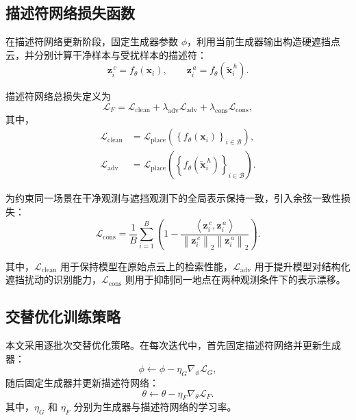 \documentclass[UTF8,a4paper,12pt]{ctexart}
\newcommand{\norm}[1]{\left\lVert #1 \right\rVert_2}
\newcommand{\inner}[2]{\left\langle #1, #2 \right\rangle}
\newcommand{\setc}[1]{\left\{#1\right\}}
\begin{document}
\subsection{描述符网络损失函数}
在描述符网络更新阶段，固定生成器参数 $\phi$，利用当前生成器输出构造硬遮挡点云，并分别计算干净样本与受扰样本的描述符：
\begin{equation}
\bm{z}^{\,c}_i=f_{\theta}(\bm{x}_i),\qquad
\bm{z}^{\,a}_i=f_{\theta}\!\left(\tilde{\bm{x}}^{\,h}_i\right).
\label{eq:clean_adv_embed}
\end{equation}

描述符网络总损失定义为
\begin{equation}
\mathcal{L}_{F}
=
\mathcal{L}_{\mathrm{clean}}
+
\lambda_{\mathrm{adv}}\mathcal{L}_{\mathrm{adv}}
+
\lambda_{\mathrm{cons}}\mathcal{L}_{\mathrm{cons}},
\label{eq:loss_f}
\end{equation}
其中，
\begin{align}
\mathcal{L}_{\mathrm{clean}}
&=
\mathcal{L}_{\mathrm{place}}
\left(
\setc{
f_{\theta}(\bm{x}_i)
}_{i\in\mathcal{B}}
\right),
\label{eq:loss_clean}
\\
\mathcal{L}_{\mathrm{adv}}
&=
\mathcal{L}_{\mathrm{place}}
\left(
\setc{
f_{\theta}\!\left(\tilde{\bm{x}}^{\,h}_i\right)
}_{i\in\mathcal{B}}
\right).
\label{eq:loss_adv}
\end{align}

为约束同一场景在干净观测与遮挡观测下的全局表示保持一致，引入余弦一致性损失：
\begin{equation}
\mathcal{L}_{\mathrm{cons}}
=
\frac{1}{B}
\sum_{i=1}^{B}
\left(
1-
\frac{\inner{\bm{z}^{\,c}_i}{\bm{z}^{\,a}_i}}
{\norm{\bm{z}^{\,c}_i}\norm{\bm{z}^{\,a}_i}}
\right).
\label{eq:loss_cons}
\end{equation}

其中，$\mathcal{L}_{\mathrm{clean}}$ 用于保持模型在原始点云上的检索性能，$\mathcal{L}_{\mathrm{adv}}$ 用于提升模型对结构化遮挡扰动的识别能力，$\mathcal{L}_{\mathrm{cons}}$ 则用于抑制同一地点在两种观测条件下的表示漂移。

\subsection{交替优化训练策略}
本文采用逐批次交替优化策略。在每次迭代中，首先固定描述符网络并更新生成器：
\begin{equation}
\phi \leftarrow \phi-\eta_{G}\nabla_{\phi}\mathcal{L}_{G},
\label{eq:update_g}
\end{equation}
随后固定生成器并更新描述符网络：
\begin{equation}
\theta \leftarrow \theta-\eta_{F}\nabla_{\theta}\mathcal{L}_{F}.
\label{eq:update_f}
\end{equation}
其中，$\eta_{G}$ 和 $\eta_{F}$ 分别为生成器与描述符网络的学习率。
\end{document}
